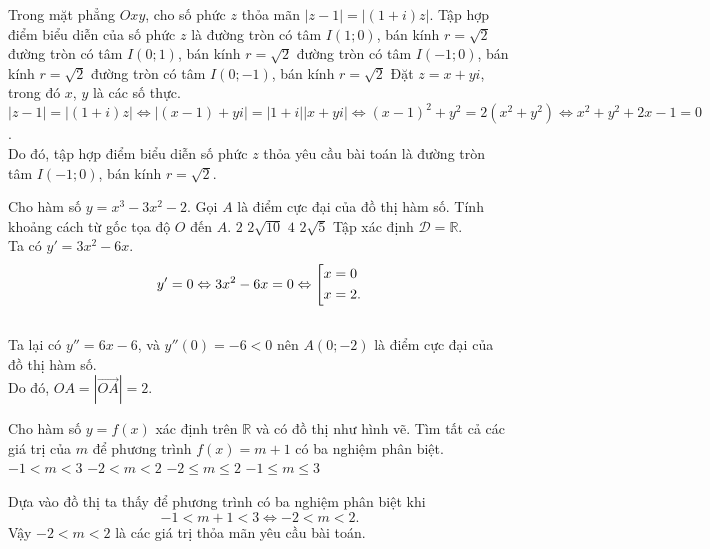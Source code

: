 \begin{ex}%
 Trong mặt phẳng $Oxy$, cho số phức $z$ thỏa mãn $|z-1|=|(1+i)z|$. Tập hợp điểm biểu diễn của số phức $z$ là
 \choice
  {đường tròn có tâm $I(1;0)$, bán kính $r=\sqrt{2}$}
  {đường tròn có tâm $I(0;1)$, bán kính $r=\sqrt{2}$}
  {\True đường tròn có tâm $I(-1;0)$, bán kính $r=\sqrt{2}$}
  {đường tròn có tâm $I(0;-1)$, bán kính $r=\sqrt{2}$}
 \loigiai
  {
  Đặt $z=x+yi$, trong đó $x$, $y$ là các số thực.\\
  $|z-1|=|(1+i)z|\Leftrightarrow |(x-1)+yi|=|1+i||x+yi|\Leftrightarrow (x-1)^2+y^2=2(x^2+y^2)\Leftrightarrow x^2+y^2+2x-1=0$.\\
  Do đó, tập hợp điểm biểu diễn số phức $z$ thỏa yêu cầu bài toán là đường tròn tâm $I(-1;0)$, bán kính $r=\sqrt 2$.
  }
\end{ex}

\begin{ex}%
 Cho hàm số $y=x^3-3x^2-2$. Gọi $A$ là điểm cực đại của đồ thị hàm số. Tính khoảng cách từ gốc tọa độ $O$ đến $A$.
 \choice
  {\True $2$}
  {$2\sqrt{10}$}
  {$4$}
  {$2\sqrt{5}$}
 \loigiai
  {
  Tập xác định $\mathscr{D}=\mathbb{R}$.\\
  Ta có $y'=3x^2-6x$.
   $$y'=0 \Leftrightarrow 3x^2-6x=0 \Leftrightarrow \left[\begin{aligned}&x=0\\&x=2.\end{aligned}\right.$$\\
  Ta lại có $y''=6x-6$, và $y''(0)=-6<0$ nên $A(0;-2)$ là điểm cực đại của đồ thị hàm số.\\
  Do đó, $OA=\left|\overrightarrow{OA}\right|=2$. 
  }
\end{ex}

\begin{ex}%
 \immini
 {Cho hàm số $y=f(x)$ xác định trên $\mathbb{R}$ và có đồ thị như hình vẽ. Tìm tất cả các giá trị của $m$ để phương trình $f(x)=m+1$ có ba nghiệm phân biệt.
 \choice
  {$-1<m<3$}
  {\True $-2<m<2$}
  {$-2\leq m \leq 2$}
  {$-1\leq m \leq 3$}
 }
 {
 }
 \loigiai
  {
  Dựa vào đồ thị ta thấy để phương trình có ba nghiệm phân biệt khi
  $$-1<m+1<3 \Leftrightarrow -2<m<2.$$
  Vậy $-2<m<2$ là các giá trị thỏa mãn yêu cầu bài toán.
  }
\end{ex}

